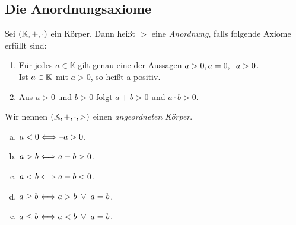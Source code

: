 \documentclass[../ana1.tex]{subfiles}
\begin{document}
\subsection{Die Anordnungsaxiome}
\setcounter{satz}{-1} %

\begin{defi}
	Sei \((\mathbb{K} , + , \cdot) \) ein Körper.
	Dann heißt \(> \) eine \textit{Anordnung}, falls folgende Axiome erfüllt sind:
	\begin{enumerate}[label= (A\arabic*)]
		\item\label{ax:A1}Für jedes \(a \in \mathbb{K} \) gilt genau eine der Aussagen \(a > 0 \ko a = 0 \ko \minus a > 0 \). \\
		      Ist \(a \in \mathbb{K} \) mit \(a > 0 \), so heißt a positiv.
		\item\label{ax:A2}Aus \(a>0 \) und \(b>0 \) folgt \(a + b > 0 \) und \(a \cdot b > 0 \).
	\end{enumerate}
	Wir nennen \((\mathbb{K} , + , \cdot , >) \) einen \textit{angeordneten Körper}.
\end{defi}

\begin{notation}\leavevmode
	\begin{enumerate}[(a)]
		\item \(a < 0 \longeq \minus a > 0 \).
		\item \(a > b \mathrel{\Longleftrightarrow} a - b > 0 \). \qquad \qquad \quad {}
		\item \(a < b \mathrel{\Longleftrightarrow} a - b < 0 \).
		\item \(a \geq b \mathrel{\Longleftrightarrow} a > b  \; \vee  \;  a = b \).
		\item \(a \leq b \mathrel{\Longleftrightarrow} a < b  \; \vee  \;  a = b \).
	\end{enumerate}
\end{notation}
\end{document}
